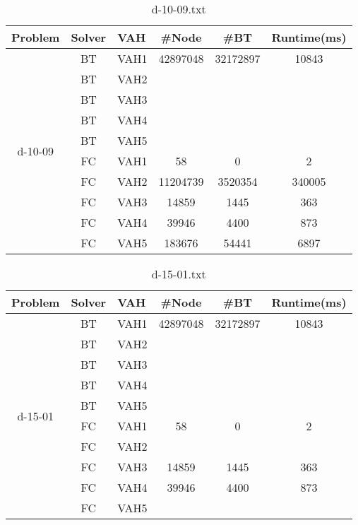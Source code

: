 \documentclass{article}
\begin{document}
\begin{table}[]
\caption{d-10-09.txt}
\label{tab:my-table}
\begin{tabular}{|c|c|c|c|c|c|}
\hline
Problem & Solver & \multicolumn{1}{l|}{VAH} & \#Node & \#BT & \multicolumn{1}{l|}{Runtime(ms)} \\ \hline
\multirow{10}{*}{d-10-09} & BT & VAH1 & 42897048 & 32172897 & 10843 \\ \cline{2-6} 
 & BT & VAH2 &  &  &  \\ \cline{2-6} 
 & BT & VAH3 &  &  &  \\ \cline{2-6} 
 & BT & VAH4 &  &  &  \\ \cline{2-6} 
 & BT & VAH5 &  &  &  \\ \cline{2-6} 
 & FC & VAH1 & 58 & 0 & 2 \\ \cline{2-6} 
 & FC & VAH2 & 11204739 & 3520354 & 340005 \\ \cline{2-6} 
 & FC & VAH3 & 14859 & 1445 & 363 \\ \cline{2-6} 
 & FC & VAH4 & 39946 & 4400 & 873 \\ \cline{2-6} 
 & FC & VAH5 & 183676 & 54441 & 6897 \\ \hline
\end{tabular}
\end{table}

\begin{table}[]
\caption{d-15-01.txt}
\begin{tabular}{|c|c|c|c|c|c|}
\hline
Problem & Solver & \multicolumn{1}{l|}{VAH} & \#Node & \#BT & \multicolumn{1}{l|}{Runtime(ms)} \\ \hline
\multirow{10}{*}{d-15-01} & BT & VAH1 & 42897048 & 32172897 & 10843 \\ \cline{2-6} 
 & BT & VAH2 &  &  &  \\ \cline{2-6} 
 & BT & VAH3 &  &  &  \\ \cline{2-6} 
 & BT & VAH4 &  &  &  \\ \cline{2-6} 
 & BT & VAH5 &  &  &  \\ \cline{2-6} 
 & FC & VAH1 & 58 & 0 & 2 \\ \cline{2-6} 
 & FC & VAH2 &  &  &  \\ \cline{2-6} 
 & FC & VAH3 & 14859 & 1445 & 363 \\ \cline{2-6} 
 & FC & VAH4 & 39946 & 4400 & 873 \\ \cline{2-6} 
 & FC & VAH5 &  &  &  \\ \hline
\end{tabular}
\end{table}
\end{document}

